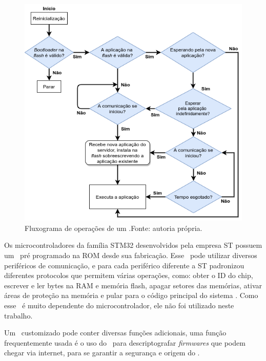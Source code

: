 \begin{figure}[H]
    \scriptsize
     \centering
     \includegraphics[scale=0.8]{dados/figuras/FluxoBootloader.png}
     \caption{Fluxograma de operações de um \bootloader.\newline Fonte: autoria própria.}
     \label{FluxoBootloader}
\end{figure}



Os microcontroladores da família STM32 desenvolvidos pela empresa ST  possuem um \bootloader\ pré programado na ROM desde sua fabricação. Esse \bootloader\ pode utilizar diversos periféricos de comunicação, e para cada periférico diferente a ST padronizou diferentes protocolos que permitem várias operações, como: obter o ID do chip, escrever e ler bytes na RAM e memória flash, apagar setores das memórias, ativar áreas de proteção na memória e pular para o código principal do sistema \cite{Noviello2018}. Como esse \bootloader\ é muito dependente do microcontrolador, ele não foi utilizado neste trabalho.

Um \bootloader\ customizado pode conter diversas funções adicionais, uma função frequentemente usada é o uso do \bootloader\ para descriptografar \textit{firmwares} que podem chegar via internet, para se garantir a segurança e origem do \firmware.




